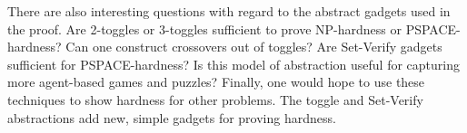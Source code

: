 There are also interesting questions with regard to the abstract gadgets used in the proof. Are 2-toggles or 3-toggles sufficient to prove NP-hardness or PSPACE-hardness? Can one construct crossovers out of toggles? Are Set-Verify gadgets sufficient for PSPACE-hardness? Is this model of abstraction useful for capturing more agent-based games and puzzles? Finally, one would hope to use these techniques to show hardness for other problems. The toggle and Set-Verify abstractions add new, simple gadgets for proving hardness. 
%
%

